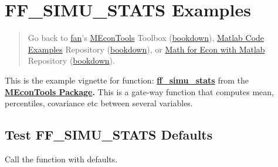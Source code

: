 \documentclass[
]{book}
\begin{document}
\hypertarget{ff_simu_stats-examples}{%
\section{FF\_SIMU\_STATS Examples}\label{ff_simu_stats-examples}}

\begin{quote}
Go back to \href{http://fanwangecon.github.io/}{fan}'s \href{https://fanwangecon.github.io/MEconTools/}{MEconTools} Toolbox (\href{https://fanwangecon.github.io/MEconTools/bookdown}{bookdown}), \href{https://fanwangecon.github.io/M4Econ/}{Matlab Code Examples} Repository (\href{https://fanwangecon.github.io/M4Econ/bookdown}{bookdown}), or \href{https://fanwangecon.github.io/Math4Econ/}{Math for Econ with Matlab} Repository (\href{https://fanwangecon.github.io/Math4Econ/bookdown}{bookdown}).
\end{quote}

This is the example vignette for function:
\href{https://github.com/FanWangEcon/MEconTools/blob/master/MEconTools/stats/ff_simu_stats.m}{\textbf{ff\_simu\_stats}}
from the \href{https://fanwangecon.github.io/MEconTools/}{\textbf{MEconTools
Package}}\textbf{.} This is a
gate-way function that computes mean, percentiles, covariance etc
between several variables.

\hypertarget{test-ff_simu_stats-defaults}{%
\subsection{Test FF\_SIMU\_STATS Defaults}\label{test-ff_simu_stats-defaults}}

Call the function with defaults.
\end{document}
